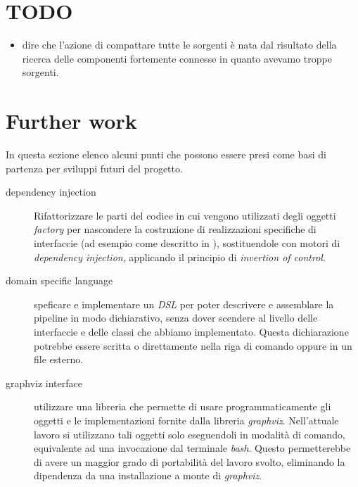
\section{TODO}
\begin{itemize}
\item dire che l'azione di compattare tutte le sorgenti \`e nata dal
  risultato della ricerca delle componenti fortemente connesse in
  quanto avevamo troppe sorgenti.
\end{itemize}

\section{Further work}

In questa sezione elenco alcuni punti che possono essere presi come
basi di partenza per sviluppi futuri del progetto. 

\begin{description}
\item[dependency injection] Rifattorizzare le parti del codice in cui
  vengono utilizzati degli oggetti \emph{factory} per nascondere la
  costruzione di realizzazioni specifiche di interfaccie (ad esempio
  come descritto in ),
  sostituendole con motori di \emph{dependency injection}, applicando
  il principio di \emph{invertion of control}.
\item[domain specific language] speficare e implementare un \emph{DSL}
  per poter descrivere e assemblare la pipeline in modo dichiarativo,
  senza dover scendere al livello delle interfaccie e delle classi che
  abbiamo implementato. Questa dichiarazione potrebbe essere scritta o
  direttamente nella riga di comando oppure in un file esterno.
\item[graphviz interface] utilizzare una libreria che permette di
  usare programmaticamente gli oggetti e le implementazioni fornite
  dalla libreria \emph{graphviz}. Nell'attuale lavoro si utilizzano
  tali oggetti solo eseguendoli in modalit\`a di comando, equivalente
  ad una invocazione dal terminale \emph{bash}. Questo permetterebbe
  di avere un maggior grado di portabilit\`a del lavoro svolto,
  eliminando la dipendenza da una installazione a monte di
  \emph{graphviz}.
\end{description}
